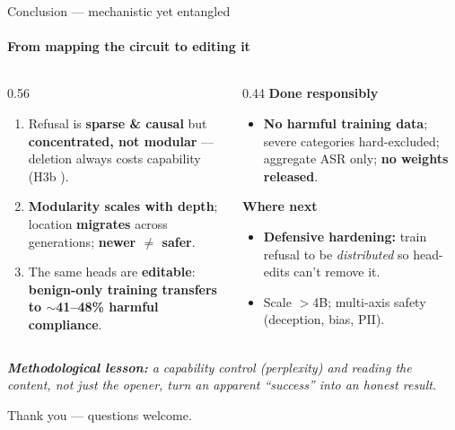 \documentclass[aspectratio=169]{beamer}
\newcommand{\bad}{\textcolor{red!70!black}{\ding{55}}}
\newcommand{\hl}[1]{\textcolor{themeblue}{\textbf{#1}}}
\begin{document}
\begin{frame}{Conclusion --- mechanistic yet entangled}
  \framesubtitle{From mapping the circuit to editing it}
  \begin{columns}[T]
    \begin{column}{0.56\textwidth}
      \footnotesize
      \begin{enumerate}
        \item Refusal is \hl{sparse \& causal} but \hl{concentrated, not modular} --- deletion always costs capability (H3b \bad).
        \item \hl{Modularity scales with depth}; location \hl{migrates} across generations; \hl{newer $\ne$ safer}.
        \item The same heads are \hl{editable}: \hl{benign-only training transfers to $\sim$41--48\% harmful compliance}.
      \end{enumerate}
    \end{column}
    \begin{column}{0.44\textwidth}
      \footnotesize
      \textbf{Done responsibly}
      \begin{itemize}\scriptsize
        \item \hl{No harmful training data}; severe categories hard-excluded; aggregate ASR only; \hl{no weights released}.
      \end{itemize}
      \vspace{2pt}
      \textbf{Where next}
      \begin{itemize}\scriptsize
        \item \hl{Defensive hardening:} train refusal to be \emph{distributed} so head-edits can't remove it.
        \item Scale $>$4B; multi-axis safety (deception, bias, PII).
      \end{itemize}
    \end{column}
  \end{columns}
  \vspace{3pt}
  {\footnotesize\itshape \hl{Methodological lesson:} a capability control (perplexity) and reading the \emph{content}, not just the opener, turn an apparent ``success'' into an honest result.}
  \vspace{2pt}\par
  \centering\small Thank you --- questions welcome.
\end{frame}

\appendix
\end{document}
